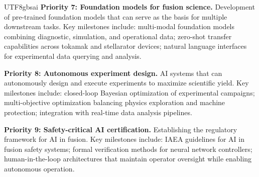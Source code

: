 \documentclass[12pt,a4paper]{article}
\begin{document}
\begin{CJK}{UTF8}{gbsai}
\textbf{Priority 7: Foundation models for fusion science.} Development of pre-trained foundation models that can serve as the basis for multiple downstream tasks. Key milestones include: multi-modal foundation models combining diagnostic, simulation, and operational data; zero-shot transfer capabilities across tokamak and stellarator devices; natural language interfaces for experimental data querying and analysis.

\textbf{Priority 8: Autonomous experiment design.} AI systems that can autonomously design and execute experiments to maximize scientific yield. Key milestones include: closed-loop Bayesian optimization of experimental campaigns; multi-objective optimization balancing physics exploration and machine protection; integration with real-time data analysis pipelines.

\textbf{Priority 9: Safety-critical AI certification.} Establishing the regulatory framework for AI in fusion. Key milestones include: IAEA guidelines for AI in fusion safety systems; formal verification methods for neural network controllers; human-in-the-loop architectures that maintain operator oversight while enabling autonomous operation.


\end{CJK}
\end{document}
